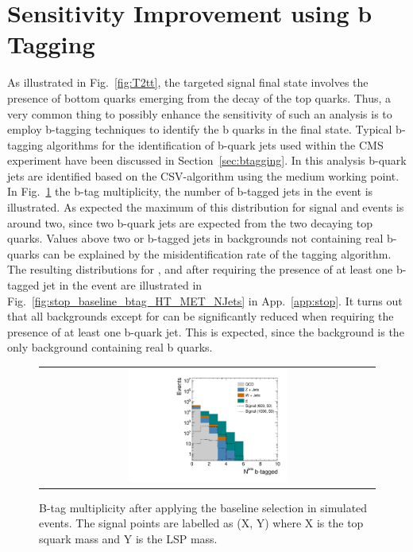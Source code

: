\section{Sensitivity Improvement using b Tagging}
\label{sec:stop_btagging}
As illustrated in Fig.~\ref{fig:T2tt}, the targeted signal final state involves the presence of bottom quarks emerging from the decay of the top quarks. Thus, a very common thing to possibly enhance the sensitivity of such an analysis is to employ b-tagging techniques to identify the b quarks in the final state. Typical b-tagging algorithms for the identification of b-quark jets used within the CMS experiment have been discussed in Section~\ref{sec:btagging}. In this analysis b-quark jets are identified based on the CSV-algorithm using the medium working point. In Fig.~\ref{fig:stop_baseline_btag} the b-tag multiplicity, \ie the number of b-tagged jets in the event is illustrated. As expected the maximum of this distribution for signal and \ttbar events is around two, since two b-quark jets are expected from the two decaying top quarks. Values above two or b-tagged jets in backgrounds not containing real b-quarks can be explained by the misidentification rate of the tagging algorithm. \\
The resulting distributions for \HT, \met and \NJets after requiring the presence of at least one b-tagged jet in the event are illustrated in Fig.~\ref{fig:stop_baseline_btag_HT_MET_NJets} in App.~\ref{app:stop}. It turns out that all backgrounds except for \ttbar can be significantly reduced when requiring the presence of at least one b-quark jet. This is expected, since the \ttbar background is the only background containing real b quarks. \\
\begin{figure}[!t]
  \centering
  \begin{tabular}{c}
                \includegraphics[width=0.49\textwidth]{figures/Stop_DeltaPhiSelection_N_jets_btagged.pdf} 
  \end{tabular}
  \caption{B-tag multiplicity after applying the baseline selection in simulated events. The signal points are labelled as (X, Y) where X is the top squark mass and Y is the LSP mass.}
  \label{fig:stop_baseline_btag}
\end{figure}
